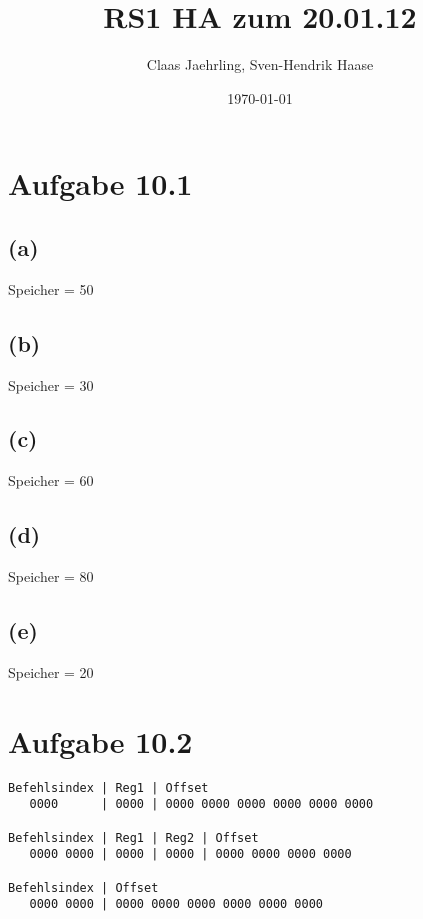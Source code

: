 \documentclass[12pt]{article}
\author{Claas Jaehrling, Sven-Hendrik Haase}
\title{RS1 HA zum 20.01.12}
\date{\today}
\begin{document}
\setcounter{secnumdepth}{0}
\maketitle

\section{Aufgabe 10.1}
\subsection{(a)}
Speicher = 50

\subsection{(b)}
Speicher = 30

\subsection{(c)}
Speicher = 60

\subsection{(d)}
Speicher = 80

\subsection{(e)}
Speicher = 20

\section{Aufgabe 10.2}
\begin{verbatim}
Befehlsindex | Reg1 | Offset
   0000      | 0000 | 0000 0000 0000 0000 0000 0000
 
Befehlsindex | Reg1 | Reg2 | Offset
   0000 0000 | 0000 | 0000 | 0000 0000 0000 0000

Befehlsindex | Offset
   0000 0000 | 0000 0000 0000 0000 0000 0000
\end{verbatim}
\end{document}
